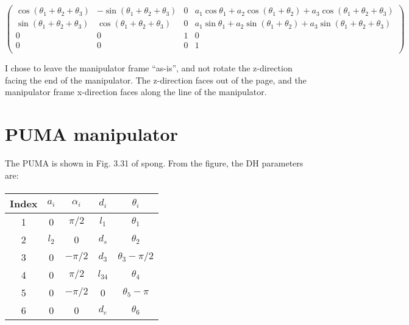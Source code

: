 \documentclass{article}
\begin{document}
\[ \left( \begin{matrix}
		\cos \left( \theta_1 + \theta_2 + \theta_3 \right) 
			& - \sin \left( \theta_1 + \theta_2 + \theta_3 \right)
			& 0 
			& a_1 \cos \theta_1 + a_2 \cos \left( \theta_1 + \theta_2 \right)
				+ a_3 \cos \left( \theta_1 + \theta_2 + \theta_3 \right) \\
		\sin \left( \theta_1 + \theta_2 + \theta_3 \right) 
			& \cos \left( \theta_1 + \theta_2 + \theta_3 \right)
			& 0 
			& a_1 \sin \theta_1 + a_2 \sin \left( \theta_1 + \theta_2 \right)
				+ a_3 \sin \left( \theta_1 + \theta_2 + \theta_3 \right) \\
		0 & 0 & 1 & 0 \\
		0 & 0 & 0 & 1 \\
	\end{matrix} \right) \]

I chose to leave the manipulator frame ``as-is'', and not rotate the z-direction
	facing the end of the manipulator.
The z-direction faces out of the page, and the manipulator frame x-direction
	faces along the line of the manipulator.

\section{PUMA manipulator}

The PUMA is shown in Fig. 3.31 of spong.
From the figure, the DH parameters are:

\paragraph{}
\begin{tabular}{|c|c|c|c|c|}
\hline
Index & $a_i$ & $\alpha_i$ & $d_i$ & $\theta_i$ \\
\hline
1 & 0 & $\pi/2$ & $l_1$ & $\theta_1$ \\
2 & $l_2$ & 0 & $d_s$ & $\theta_2$ \\
3 & 0 & $-\pi/2$  & $d_3$ & $\theta_3 - \pi/2$ \\ 
4 & 0 & $\pi/2$  & $l_{34}$ & $\theta_4$ \\
5 & 0 & $-\pi/2$  & 0 & $\theta_5 - \pi$ \\
6 & 0 & 0 & $d_e$ & $\theta_6$ \\ 
\hline
\end{tabular}
\paragraph{}
\end{document}
